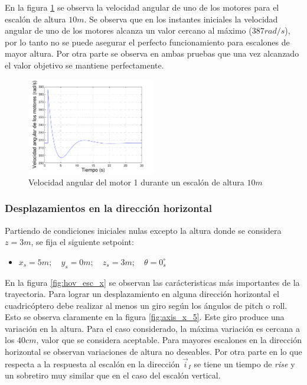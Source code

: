 \documentclass[main]{subfiles}
\begin{document}
En la figura \ref{fig:w_z_10} se observa la velocidad angular de uno de los motores para el escal\'on de altura $10m$. Se observa que en los instantes iniciales la velocidad angular de uno de los motores alcanza un valor cercano al m\'aximo ($387rad/s$), por lo tanto no se puede asegurar el perfecto funcionamiento para escalones de mayor altura. Por otra parte se observa en ambas pruebas que una vez alcanzado el valor objetivo se mantiene perfectamente.\\

\begin{figure}[h!]
  \centering
	\includegraphics[width=0.5\textwidth]{./pics_sim_control/hov/w_z_10.pdf}
  \caption{Velocidad angular del motor 1 durante un escal\'on de altura $10m$}
  \label{fig:w_z_10}
\end{figure}


\subsubsection{Desplazamientos en la direcci\'on horizontal}
Partiendo de condiciones iniciales nulas excepto la altura donde se considera $z = 3 m$, se fija el siguiente setpoint:
\begin{itemize}
\item ${x_s = 5 m;\quad y_s = 0 m;\quad z_s = 3 m;\quad \theta = 0_s^\circ}$
\end{itemize}

En la figura \ref{fig:hov_esc_x} se observan las car\'acteristicas m\'as importantes de la trayectoria. Para lograr un desplazamiento en alguna direcci\'on horizontal el cuadric\'optero debe realizar al menos un giro seg\'un los \'angulos de pitch o roll. Esto se observa claramente en la figura \ref{fig:axis_x_5}. Este giro produce una variaci\'on en la altura. Para el caso considerado, la m\'axima variaci\'on es cercana a los $40cm$, valor que se considera aceptable. Para mayores escalones en la direcci\'on horizontal se observan variaciones de altura no deseables. Por otra parte en lo que respecta a la respuesta al escal\'on en la direcci\'on $\vec{i}_I$ se tiene un tiempo de \emph{rise} y un sobretiro muy similar que en el caso del escal\'on vertical.\\
\end{document}
